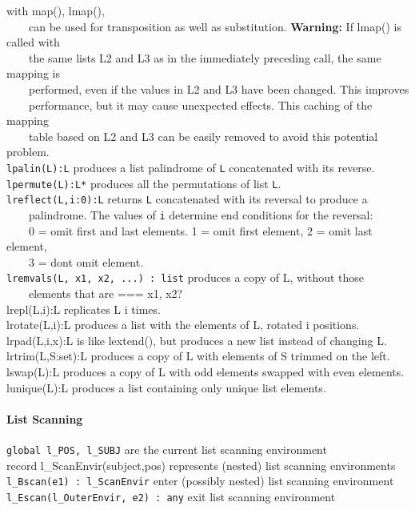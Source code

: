 with \textsf{map(), lmap()},\\
 \ \ \ \ can be used for transposition as well as substitution.
\textbf{Warning: }If \textsf{lmap()} is called with\\
 \ \ \ \ the same lists \textsf{L2} and \textsf{L3} as in the
immediately preceding call, the same mapping is\\
 \ \ \ \ performed, even if the values in \textsf{L2} and \textsf{L3}
have been changed. This improves\\
 \ \ \ \ performance, but it may cause unexpected effects. This
{\textquotedbl}caching{\textquotedbl} of the mapping\\
 \ \ \ \ table based on \textsf{L2} and \textsf{L3} can be easily
removed to avoid this potential problem.\\
\texttt{lpalin(L):L} produces a list palindrome of \texttt{L}
concatenated with its reverse.\\
\texttt{lpermute(L):L*} produces all the permutations of list
\texttt{L}.\\
\texttt{lreflect(L,i:0):L} returns \texttt{L} concatenated with its
reversal to produce a\\
 \ \ \ \ palindrome. The values of \texttt{i} determine
{\textquotedbl}end conditions{\textquotedbl} for the reversal:\\
 \ \ \ \ 0 = omit first and last elements. 1 = omit first element, 2 =
omit last element,\\
 \ \ \ \ 3 = don{\textquotesingle}t omit element.\\
\texttt{lremvals(L, x1, x2, ...) : list} produces a copy of L, without
those\\
 \ \ \ \ elements that are === x1, x2?\\
lrepl(L,i):L replicates L i
times.\\
lrotate(L,i):L produces a list with the elements of L, rotated i
positions.\\
lrpad(L,i,x):L is like lextend(), but produces a new list instead of
changing L.\\
lrtrim(L,S:set):L produces a copy of L with elements of S trimmed on the
left.\\
lswap(L):L produces a copy of L with odd elements swapped with even
elements.\\
lunique(L):L produces a list containing only unique list elements.

\paragraph{List Scanning}
\texttt{global l\_POS, l\_SUBJ} are the current list scanning
environment\\
\textsf{record l\_ScanEnvir(subject,pos)} represents (nested) list
scanning environments\\
\texttt{l\_Bscan(e1) : l\_ScanEnvir} enter (possibly nested) list
scanning environment\\
\texttt{l\_Escan(l\_OuterEnvir, e2) : any} exit list scanning
environment

